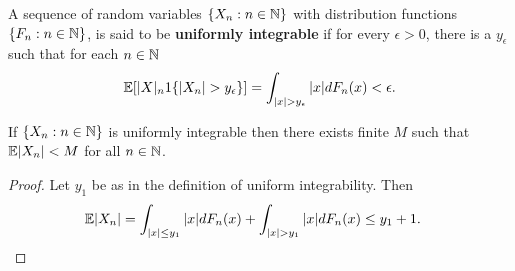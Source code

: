 \documentclass[a4paper,10pt,english]{article}
\begin{document}
\begin{defn}
A sequence of random variables $\{X_n : n \in \mathbb{N}\}$ with distribution functions $\{F_n: n \in \mathbb{N} \}$, 
is said to be \textbf{uniformly integrable} if for every $\epsilon>0$, there is a $y_\epsilon$ such that for each $n \in \mathbb{N}$
\begin{align*}
\E[|X|_n1\{|X_n| > y_{\epsilon}\}] = \int_{|x|>y_\epsilon}|x|dF_{n}(x) < \epsilon.
\end{align*}
\end{defn}
\begin{lem}
If $\{X_n : n \in \mathbb{N}\}$ is uniformly integrable then there exists finite $M$ such that $\mathbb{E}|X_n|<M$ for all $n \in \mathbb{N}$.
\end{lem}
\begin{proof}
Let $y_1$ be as in the definition of uniform integrability. Then
\begin{align*}
\E|X_n|&=\int_{|x|\leq y_1}|x|dF_n(x)+\int_{|x|>y_1}|x|dF_n(x) \leq y_1+1.
\end{align*}
\end{proof}
\end{document}

